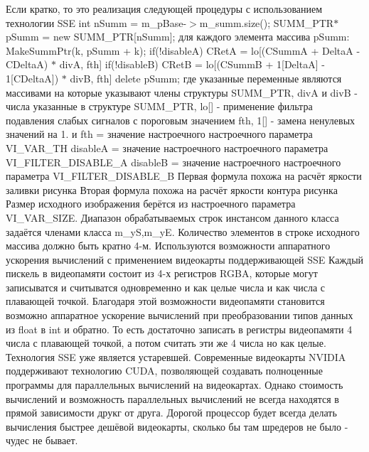 Если кратко, то это реализация следующей процедуры с использованием технологии S\+S\+E int n\+Summ = m\+\_\+p\+Base-\/$>$m\+\_\+summ.\+size(); S\+U\+M\+M\+\_\+\+P\+T\+R$\ast$ p\+Summ = new S\+U\+M\+M\+\_\+\+P\+T\+R\mbox{[}n\+Summ\mbox{]}; для каждого элемента массива p\+Summ\+: Make\+Summ\+Ptr(k, p\+Summ + k); if(!disable\+A) C\+Ret\+A = lo\mbox{[}(C\+Summ\+A + Delta\+A -\/ C\+Delta\+A) $\ast$ div\+A, fth\mbox{]} if(!disable\+B) C\+Ret\+B = lo\mbox{[}(C\+Summ\+B + 1\mbox{[}Delta\+A\mbox{]} -\/ 1\mbox{[}C\+Delta\+A\mbox{]}) $\ast$ div\+B, fth\mbox{]} delete p\+Summ; где указанные переменные являются массивами на которые указывают члены структуры S\+U\+M\+M\+\_\+\+P\+T\+R, div\+A и div\+B -\/ числа указанные в структуре S\+U\+M\+M\+\_\+\+P\+T\+R, lo\mbox{[}\mbox{]} -\/ применение фильтра подавления слабых сигналов с пороговым значением fth, 1\mbox{[}\mbox{]} -\/ замена ненулевых значений на 1. и fth = значение настроечного настроечного параметра V\+I\+\_\+\+V\+A\+R\+\_\+\+T\+H disable\+A = значение настроечного настроечного параметра V\+I\+\_\+\+F\+I\+L\+T\+E\+R\+\_\+\+D\+I\+S\+A\+B\+L\+E\+\_\+\+A disable\+B = значение настроечного настроечного параметра V\+I\+\_\+\+F\+I\+L\+T\+E\+R\+\_\+\+D\+I\+S\+A\+B\+L\+E\+\_\+\+B Первая формула похожа на расчёт яркости заливки рисунка Вторая формула похожа на расчёт яркости контура рисунка Размер исходного изображения берётся из настроечного параметра V\+I\+\_\+\+V\+A\+R\+\_\+\+S\+I\+Z\+E. Диапазон обрабатываемых строк инстансом данного класса задаётся членами класса m\+\_\+y\+S,m\+\_\+y\+E. Количество элементов в строке исходного массива должно быть кратно 4-\/м. Используются возможности аппаратного ускорения вычислений с применением видеокарты поддерживающей S\+S\+E Каждый пискель в видеопамяти состоит из 4-\/х регистров R\+G\+B\+A, которые могут записыватся и считыватся одновременно и как целые числа и как числа с плавающей точкой. Благодаря этой возможности видеопамяти становится возможно аппаратное ускорение вычислений при преобразовании типов данных из float в int и обратно. То есть достаточно записать в регистры видеопамяти 4 числа с плавающей точкой, а потом считать эти же 4 числа но как целые. Технология S\+S\+E уже является устаревшей. Современные видеокарты N\+V\+I\+D\+I\+A поддерживают технологию C\+U\+D\+A, позволяющей создавать полноценные программы для параллельных вычислений на видеокартах. Однако стоимость вычислений и возможность параллельных вычислений не всегда находятся в прямой зависимости друкг от друга. Дорогой процессор будет всегда делать вычисления быстрее дешёвой видеокарты, сколько бы там шредеров не было -\/ чудес не бывает. 


